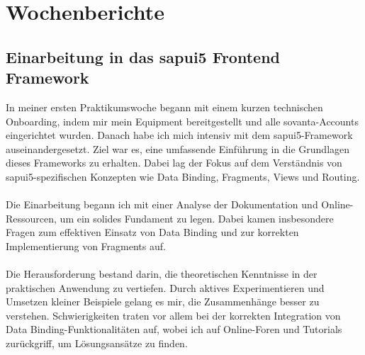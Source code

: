 \chapter{Wochenberichte}
\label{ch:wochenberichte}

\section{Einarbeitung in das \acs{sapui5} Frontend Framework}
In meiner ersten Praktikumswoche begann mit einem kurzen technischen Onboarding, indem mir mein Equipment bereitgestellt und alle sovanta-Accounts eingerichtet wurden. Danach habe ich mich intensiv mit dem \acs{sapui5}-Framework auseinandergesetzt. Ziel war es, eine umfassende Einführung in die Grundlagen dieses Frameworks zu erhalten. Dabei lag der Fokus auf dem Verständnis von \acs{sapui5}-spezifischen Konzepten wie Data Binding, Fragments, Views und Routing. \\\\
Die Einarbeitung begann ich mit einer Analyse der Dokumentation und Online-Ressourcen, um ein solides Fundament zu legen. Dabei kamen insbesondere Fragen zum effektiven Einsatz von Data Binding und zur korrekten Implementierung von Fragments auf. \\\\
Die Herausforderung bestand darin, die theoretischen Kenntnisse in der praktischen Anwendung zu vertiefen. Durch aktives Experimentieren und Umsetzen kleiner Beispiele gelang es mir, die Zusammenhänge besser zu verstehen. Schwierigkeiten traten vor allem bei der korrekten Integration von Data Binding-Funktionalitäten auf, wobei ich auf Online-Foren und Tutorials zurückgriff, um Lösungsansätze zu finden. \\\\

